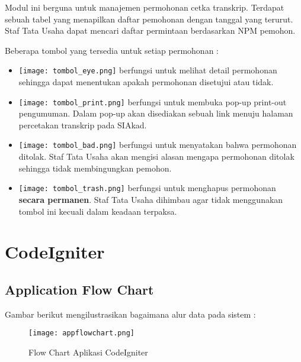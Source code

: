Modul ini berguna untuk manajemen permohonan cetka transkrip. Terdapat sebuah tabel yang menapilkan daftar pemohonan dengan tanggal yang terurut. Staf Tata Usaha dapat mencari daftar permintaan berdasarkan NPM pemohon.

Beberapa tombol yang tersedia untuk setiap permohonan :

\begin{itemize}
\item \texttt{[image: tombol\_eye.png]} berfungsi untuk melihat detail permohonan sehingga dapat menentukan apakah permohonan disetujui atau tidak.
\item \texttt{[image: tombol\_print.png]} berfungsi untuk membuka pop-up print-out pengumuman. Dalam pop-up akan disediakan sebuah link menuju halaman percetakan transkrip pada SIAkad.
\item \texttt{[image: tombol\_bad.png]} berfungsi untuk menyatakan bahwa permohonan ditolak. Staf Tata Usaha akan mengisi alasan mengapa permohonan ditolak sehingga tidak membingungkan pemohon.
\item \texttt{[image: tombol\_trash.png]} berfungsi untuk menghapus permohonan \textbf{secara permanen}. Staf Tata Usaha dihimbau agar tidak menggunakan tombol ini kecuali dalam keadaan terpaksa.
\end{itemize}  

\section{CodeIgniter}
\label{sec:code_igniter}

\subsection{Application Flow Chart}
Gambar berikut mengilustrasikan bagaimana alur data pada sistem :

\begin{figure} [H]
	\centering  
	\texttt{[image: appflowchart.png]}  
	\caption{Flow Chart Aplikasi CodeIgniter}
	\label{fig:flow-chart-CodeIgniter} 
\end{figure}

